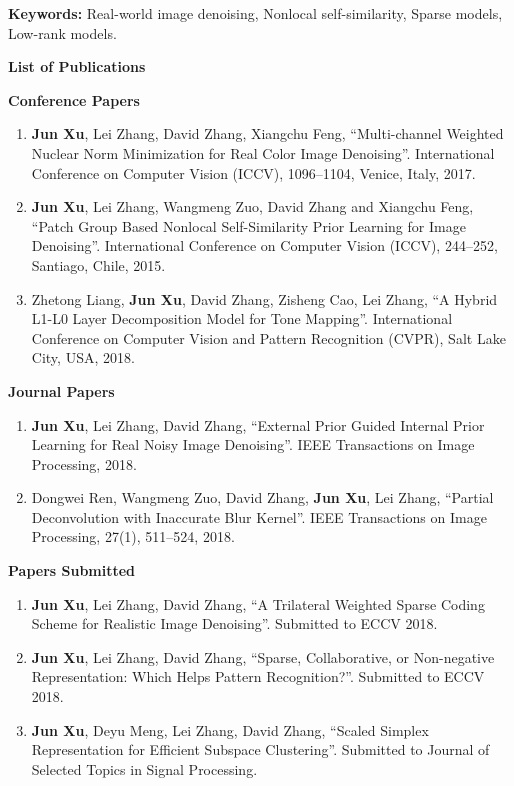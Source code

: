 \documentclass[12pt,oneside]{report}
\numberwithin{figure}{chapter}
\newenvironment{preliminary}%
{\pagestyle{plain}\pagenumbering{roman}}%
{\pagenumbering{arabic}}
\begin{document}
\begin{preliminary}
\textbf{Keywords:} Real-world image denoising, Nonlocal self-similarity, Sparse models, Low-rank models.

\newpage
{}
\Large\begin{center}\textbf{List of Publications}\end{center}\normalsize

\textbf{Conference Papers}
\begin{enumerate}
  \item \textbf{Jun Xu}, Lei Zhang, David Zhang, Xiangchu Feng, ``Multi-channel Weighted Nuclear Norm Minimization for Real Color Image Denoising''. International Conference on Computer Vision (ICCV), 1096--1104, Venice, Italy, 2017.
\vspace{-3mm}
  \item \textbf{Jun Xu}, Lei Zhang, Wangmeng Zuo, David Zhang and Xiangchu Feng, ``Patch Group Based Nonlocal Self-Similarity Prior Learning for Image Denoising''. International Conference on Computer Vision (ICCV), 244--252, Santiago, Chile, 2015.
\vspace{-3mm}
 \item Zhetong Liang, \textbf{Jun Xu}, David Zhang, Zisheng Cao, Lei Zhang, ``A Hybrid L1-L0 Layer Decomposition Model for Tone Mapping''. International Conference on Computer Vision and Pattern Recognition (CVPR), Salt Lake City, USA, 2018.
\end{enumerate}

\textbf{Journal Papers}
\begin{enumerate}
 \item \textbf{Jun Xu}, Lei Zhang, David Zhang, ``External Prior Guided Internal Prior Learning for Real Noisy Image Denoising''. IEEE Transactions on Image Processing, 2018.
\vspace{-3mm}
  \item Dongwei Ren, Wangmeng Zuo, David Zhang, \textbf{Jun Xu}, Lei Zhang, ``Partial Deconvolution with Inaccurate Blur Kernel''. IEEE Transactions on Image Processing, 27(1), 511--524, 2018. 

\end{enumerate}


\textbf{Papers Submitted}
\begin{enumerate}
 \item \textbf{Jun Xu}, Lei Zhang, David Zhang, ``A Trilateral Weighted Sparse Coding Scheme for Realistic Image Denoising''. Submitted to ECCV 2018.
\vspace{-3mm}
 \item \textbf{Jun Xu}, Lei Zhang, David Zhang, ``Sparse, Collaborative, or Non-negative Representation: Which Helps Pattern Recognition?''. Submitted to ECCV 2018.
\vspace{-3mm}
\item \textbf{Jun Xu}, Deyu Meng, Lei Zhang, David Zhang, ``Scaled Simplex Representation for Efficient Subspace Clustering''. Submitted to Journal of Selected Topics in Signal Processing.
\end{enumerate}


\end{preliminary}
\end{document}

